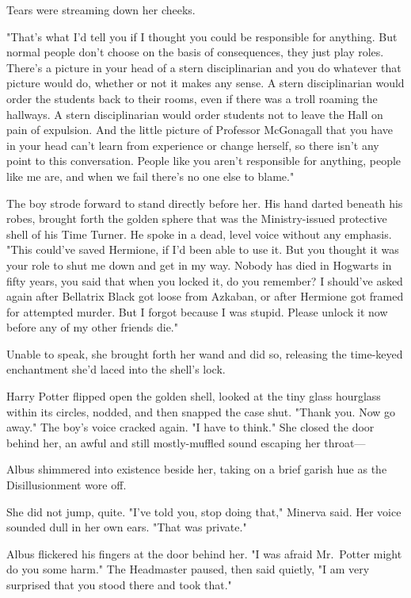 Tears were streaming down her cheeks.

"That's what I'd tell you if I thought you could be responsible for anything.
But normal people don't choose on the basis of consequences, they just play
roles. There's a picture in your head of a stern disciplinarian and you do
whatever that picture would do, whether or not it makes any sense. A stern
disciplinarian would order the students back to their rooms, even if there was
a troll roaming the hallways. A stern disciplinarian would order students not
to leave the Hall on pain of expulsion. And the little picture of Professor
McGonagall that you have in your head can't learn from experience or change
herself, so there isn't any point to this conversation. People like you aren't
responsible for anything, people like me are, and when we fail there's no one
else to blame."

The boy strode forward to stand directly before her. His hand darted beneath
his robes, brought forth the golden sphere that was the Ministry-issued
protective shell of his Time Turner. He spoke in a dead, level voice without
any emphasis. "This could've saved Hermione, if I'd been able to use it. But
you thought it was your role to shut me down and get in my way. Nobody has died
in Hogwarts in fifty years, you said that when you locked it, do you remember?
I should've asked again after Bellatrix Black got loose from Azkaban, or after
Hermione got framed for attempted murder. But I forgot because I was stupid.
Please unlock it now before any of my other friends die."

Unable to speak, she brought forth her wand and did so, releasing the
time-keyed enchantment she'd laced into the shell's lock.

Harry Potter flipped open the golden shell, looked at the tiny glass hourglass
within its circles, nodded, and then snapped the case shut. "Thank you. Now go
away." The boy's voice cracked again. "I have to think."
\later
She closed the door behind her, an awful and still mostly-muffled sound
escaping her throat---

Albus shimmered into existence beside her, taking on a brief garish hue as the
Disillusionment wore off.

She did not jump, quite. "I've told you, stop doing that," Minerva said. Her
voice sounded dull in her own ears. "That was private."

Albus flickered his fingers at the door behind her. "I was afraid Mr.~Potter
might do you some harm." The Headmaster paused, then said quietly, "I am very
surprised that you stood there and took that."

